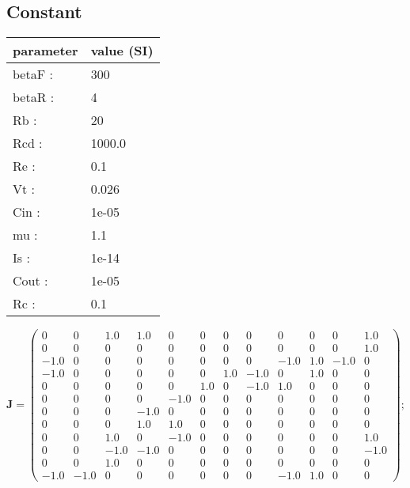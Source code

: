 \documentclass[11pt, oneside]{article}      %
\begin{document}
\subsection{Constant}
%
\begin{center}
%
\begin{tabular}{ll}
%
\hline
parameter & value (SI)
\\ \hline
betaF :& 300
\\
betaR :& 4
\\
Rb :& 20
\\
Rcd :& 1000.0
\\
Re :& 0.1
\\
Vt :& 0.026
\\
Cin :& 1e-05
\\
mu :& 1.1
\\
Is :& 1e-14
\\
Cout :& 1e-05
\\
Rc :& 0.1
\\
\hline
\end{tabular}
%
\end{center}
%
$ \mathbf{J} = \left(\begin{array}{cccccccccccc}0 & 0 & 1.0 & 1.0 & 0 & 0 & 0 & 0 & 0 & 0 & 0 & 1.0\\0 & 0 & 0 & 0 & 0 & 0 & 0 & 0 & 0 & 0 & 0 & 1.0\\-1.0 & 0 & 0 & 0 & 0 & 0 & 0 & 0 & -1.0 & 1.0 & -1.0 & 0\\-1.0 & 0 & 0 & 0 & 0 & 0 & 1.0 & -1.0 & 0 & 1.0 & 0 & 0\\0 & 0 & 0 & 0 & 0 & 1.0 & 0 & -1.0 & 1.0 & 0 & 0 & 0\\0 & 0 & 0 & 0 & -1.0 & 0 & 0 & 0 & 0 & 0 & 0 & 0\\0 & 0 & 0 & -1.0 & 0 & 0 & 0 & 0 & 0 & 0 & 0 & 0\\0 & 0 & 0 & 1.0 & 1.0 & 0 & 0 & 0 & 0 & 0 & 0 & 0\\0 & 0 & 1.0 & 0 & -1.0 & 0 & 0 & 0 & 0 & 0 & 0 & 1.0\\0 & 0 & -1.0 & -1.0 & 0 & 0 & 0 & 0 & 0 & 0 & 0 & -1.0\\0 & 0 & 1.0 & 0 & 0 & 0 & 0 & 0 & 0 & 0 & 0 & 0\\-1.0 & -1.0 & 0 & 0 & 0 & 0 & 0 & 0 & -1.0 & 1.0 & 0 & 0\end{array}\right) ; $ 
%
\\
%
\end{document}
